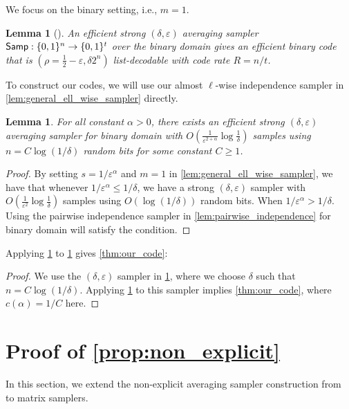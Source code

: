 \documentclass[10pt,a4paper]{article}
\newtheorem{lemma}[theorem]{Lemma}
\newcommand{\eps}{\varepsilon}
\newcommand{\1}{\mathbbm{1}}
\newcommand{\zo}{\{0, 1\}}
\newcommand{\Smp}{\textup{\textsf{Samp}}}
\begin{document}
We focus on the binary setting, i.e., $m=1$.

\begin{lemma}[\cite{ExtractorCodes}]
    \label{lem:sampler_implies_codes}
    An efficient strong $(\delta, \eps)$ averaging sampler $\Smp : \zo^n \to \zo^t$ over the binary domain gives an efficient binary code that is $ (\rho = \frac{1}{2} - \eps, \delta 2^n)$ list-decodable with code rate $R = n / t$.
\end{lemma}

To construct our codes, we will use our almost $\ell$-wise independence sampler in \cref{lem:general_ell_wise_sampler} directly.
\begin{lemma}
    \label{lem:code_sampler}
    For all constant $\alpha > 0$,
     there exists an efficient strong $(\delta, \eps)$ averaging sampler for binary domain with $O(\frac{1}{\eps^{2 + \alpha}} \log \frac{1}{\delta})$ samples using $n = C\log(1 / \delta)$ random bits for some constant $C \ge 1$.
\end{lemma}
\begin{proof}
    By setting $s = 1 / \eps^\alpha$ and $m = 1$ in \cref{lem:general_ell_wise_sampler}, we have that whenever $1 / \eps^\alpha \le 1 / \delta$, we have a strong $(\delta, \eps)$ sampler with $O(\frac{1}{\eps^2} \log \frac{1}{\delta})$ samples using $O(\log(1 / \delta))$ random bits. When $1 / \eps^\alpha > 1 / \delta$. Using the pairwise independence sampler in \cref{lem:pairwise_independence} for binary domain will satisfy the condition.
\end{proof}


Applying \cref{lem:sampler_implies_codes} to \cref{lem:code_sampler}
gives \cref{thm:our_code}:
\OurCode*
\begin{proof}
    We use the $(\delta, \eps)$ sampler in \cref{lem:code_sampler}, where we choose $\delta$ such that $n = C\log(1 / \delta)$. 
    Applying \cref{lem:sampler_implies_codes} to this sampler implies \cref{thm:our_code}, where $c(\alpha) = 1 / C$ here.
\end{proof}

\label{sec:codes}


\appendix

\section{Proof of \cref{prop:non_explicit}}
\label{sec:non_explicit}

In this section, we extend the non-explicit averaging sampler construction from~\cite{CEG95} to matrix samplers.
\end{document}
